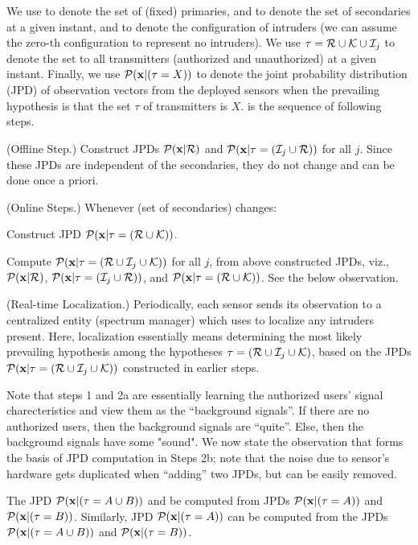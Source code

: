 We use \Pa to denote the set of (fixed) primaries, and \Ka to denote
the set of secondaries at a given instant, and \ii to denote the \jth
configuration of intruders (we can assume the zero-th configuration to
represent no intruders). We use $\tau = \mathcal{R} \cup \mathcal{K} \cup \mathcal{I}_{j}$ to denote the
set to all transmitters (authorized and unauthorized) at a given
instant.  Finally, we use $\mathcal{P}(\mathbf{x} | (\tau = X))$ to denote the joint
probability distribution (JPD) of observation vectors from the
deployed sensors when the prevailing hypothesis is that the set $\tau$
of transmitters is $X$. \ouralgoss is the sequence of following steps.
\begin{packedenumerate}
	\item
	(Offline Step.) Construct JPDs $\mathcal{P}(\mathbf{x} | \mathcal{R})$ and $\mathcal{P}(\mathbf{x} | \tau = (\mathcal{I}_{j} \cup \mathcal{R}))$ for all $j$. Since these JPDs 
	are independent of the secondaries, they do not change and
	can be done once a priori.
	\item
	(Online Steps.) Whenever \Ka (set of secondaries) changes:
	\begin{packedalpha}
		\item Construct JPD $\mathcal{P}(\mathbf{x} | \tau = (\mathcal{R} \cup \mathcal{K}))$. 
		\item Compute $\mathcal{P}(\mathbf{x} | \tau = (\mathcal{R} \cup \mathcal{I}_{j} \cup
                  \mathcal{K}))$ for all $j$, from above constructed JPDs,
                  viz., $\mathcal{P}(\mathbf{x} | \mathcal{R})$, $\mathcal{P}(\mathbf{x} | \tau = (\mathcal{I}_{j} \cup
                  \mathcal{R}))$, and $\mathcal{P}(\mathbf{x} | \tau = (\mathcal{R} \cup \mathcal{K}))$. See
                  the below observation.
	\end{packedalpha}
	\item
	(Real-time Localization.) Periodically, each sensor sends its
          observation to a centralized entity (spectrum
          manager) which uses \ouralgo to localize any intruders
          present. Here, localization essentially means determining
          the most likely prevailing hypothesis among the hypotheses
          $\tau = (\mathcal{R} \cup \mathcal{I}_{j} \cup \mathcal{K})$, based on the JPDs $\mathcal{P}(\mathbf{x} | \tau = (\mathcal{R} \cup \mathcal{I}_{j} \cup \mathcal{K}))$ constructed in earlier
          steps.
\end{packedenumerate}

Note that steps 1 and 2a are essentially learning the authorized users' signal charecteristics
and view them as the ``background signals''. 
If there are no authorized users, then the background signals are ``quite''. Else, then the background signals have some "sound".
We now state the observation that forms the basis of JPD computation
in Steps 2b; note that the noise due to sensor's hardware gets
duplicated when ``adding'' two JPDs, but can be easily removed.
\begin{obs}
  The JPD $\mathcal{P}(\mathbf{x} | (\tau = A \cup B))$ and be computed from JPDs $\mathcal{P}(\mathbf{x} | (\tau = A))$ and $\mathcal{P}(\mathbf{x} | (\tau = B))$.  Similarly,
  JPD $\mathcal{P}(\mathbf{x} | (\tau = A))$ can be computed from the JPDs $\mathcal{P}(\mathbf{x} | (\tau = A
\cup B))$ and $\mathcal{P}(\mathbf{x} | (\tau = B))$.
\end{obs}

